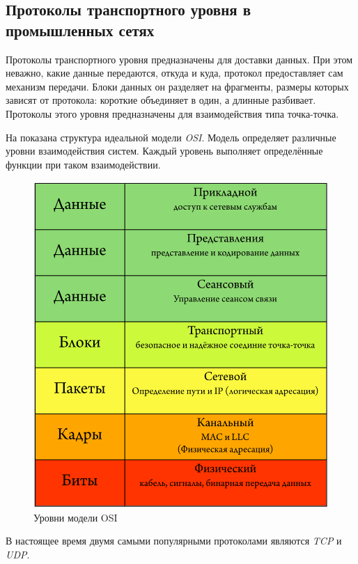 \subsection{Протоколы транспортного уровня в промышленных сетях}
Протоколы транспортного уровня предназначены для доставки данных. При этом неважно, какие данные передаются, откуда и куда, протокол предоставляет сам механизм передачи. Блоки данных он разделяет на фрагменты, размеры которых зависят от протокола: короткие объединяет в один, а длинные разбивает. Протоколы этого уровня предназначены для взаимодействия типа точка-точка. 

На  показана структура идеальной модели \textit{OSI}. Модель определяет различные уровни взаимодействия систем. Каждый уровень выполняет определённые функции при таком взаимодействии.

\begin{figure}[H]
	\centering
	\includegraphics[width=0.4\linewidth]{images/osi}
	\caption{Уровни модели OSI}
	\label{fig:osi}
\end{figure}

В настоящее время двумя самыми популярными протоколами являются \textit{TCP} и \textit{UDP}.
